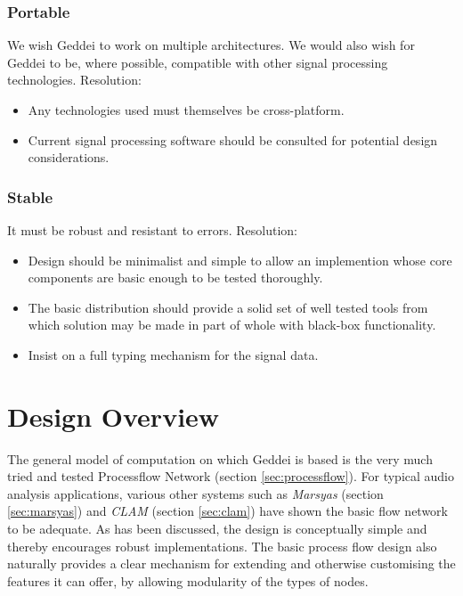 \subsubsection{Portable}

We wish Geddei to work on multiple architectures. We would also wish for Geddei to be, where possible, compatible with other signal processing technologies. Resolution:

\begin{itemize}
\item Any technologies used must themselves be cross-platform.
\item Current signal processing software should be consulted for potential design considerations.
\end{itemize}

\subsubsection{Stable}

It must be robust and resistant to errors. Resolution:

\begin{itemize}
\item Design should be minimalist and simple to allow an implemention whose core components are basic enough to be tested thoroughly.
\item The basic distribution should provide a solid set of well tested tools from which solution may be made in part of whole with black-box functionality.
\item Insist on a full typing mechanism for the signal data.
\end{itemize}

\section{Design Overview}

The general model of computation on which Geddei is based is the very much tried and tested Processflow Network (section \ref{sec:processflow}). For typical audio analysis applications, various other systems such as \textit{Marsyas} (section \ref{sec:marsyas}) and \textit{CLAM} (section \ref{sec:clam}) have shown the basic flow network to be adequate. As has been discussed, the design is conceptually simple and thereby encourages robust implementations. The basic process flow design also naturally provides a clear mechanism for extending and otherwise customising the features it can offer, by allowing modularity of the types of nodes.

